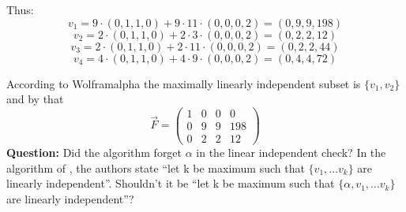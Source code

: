         Thus:
        \[ v_1 = 9 \cdot (0,1,1,0) + 9 \cdot 11 \cdot (0,0,0,2) = (0,9,9,198) \]
        \[ v_2 = 2 \cdot (0,1,1,0) + 2 \cdot 3 \cdot (0,0,0,2) = (0,2,2,12) \]
        \[ v_3 = 2 \cdot (0,1,1,0) + 2 \cdot 11 \cdot (0,0,0,2) = (0,2,2,44) \]
        \[ v_4 = 4 \cdot (0,1,1,0) + 4 \cdot 9 \cdot (0,0,0,2) = (0,4,4,72) \]
        
        According to Wolframalpha the maximally linearly independent subset is $\{v_1, v_2\}$ and by that
        \[ \overrightarrow{F} = \begin{pmatrix}
                                    1 & 0 & 0 & 0 \\
                                    0 & 9 & 9 & 198 \\
                                    0 & 2 & 2 & 12 
                                \end{pmatrix}
        \]
        \textbf{Question:} Did the algorithm forget $ \alpha$ in the linear independent check? In the algorithm of \autocite{Kiefer2013OnTC}, the authors state ``let k be maximum such that $\{v_1, \dots v_k\}$ are linearly independent''. Shouldn't it be ``let k be maximum such that $\{\alpha, v_1, \dots v_k\}$ are linearly independent''?
        \vspace{1cm}
        
